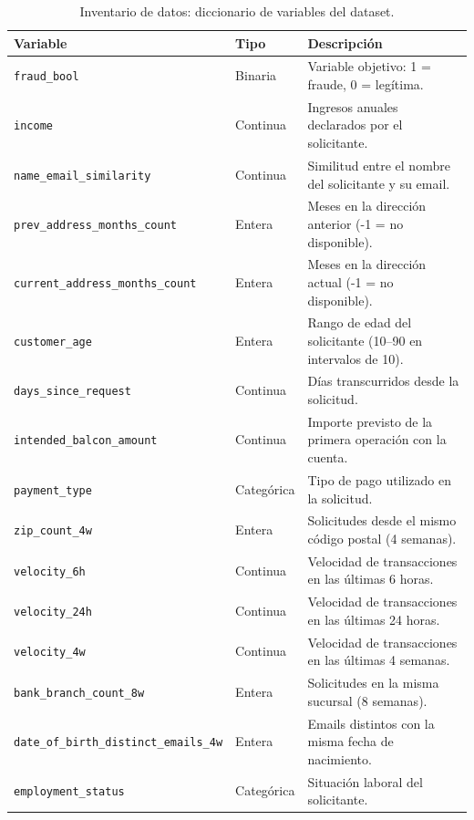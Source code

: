 \documentclass[12pt,a4paper]{report}
\begin{document}
\begin{table}[htbp]
\centering
\footnotesize
\caption{Inventario de datos: diccionario de variables del dataset.}
\label{tab:diccionario}
\begin{tabular}{l l p{7.5cm}}
\toprule
\textbf{Variable} & \textbf{Tipo} & \textbf{Descripción} \\
\midrule
\texttt{fraud\_bool}            & Binaria     & Variable objetivo: 1 = fraude, 0 = legítima. \\
\texttt{income}                 & Continua    & Ingresos anuales declarados por el solicitante. \\
\texttt{name\_email\_similarity} & Continua    & Similitud entre el nombre del solicitante y su email. \\
\texttt{prev\_address\_months\_count} & Entera & Meses en la dirección anterior (-1 = no disponible). \\
\texttt{current\_address\_months\_count} & Entera & Meses en la dirección actual (-1 = no disponible). \\
\texttt{customer\_age}          & Entera      & Rango de edad del solicitante (10--90 en intervalos de 10). \\
\texttt{days\_since\_request}   & Continua    & Días transcurridos desde la solicitud. \\
\texttt{intended\_balcon\_amount} & Continua  & Importe previsto de la primera operación con la cuenta. \\
\texttt{payment\_type}          & Categórica  & Tipo de pago utilizado en la solicitud. \\
\texttt{zip\_count\_4w}         & Entera      & Solicitudes desde el mismo código postal (4 semanas). \\
\texttt{velocity\_6h}           & Continua    & Velocidad de transacciones en las últimas 6 horas. \\
\texttt{velocity\_24h}          & Continua    & Velocidad de transacciones en las últimas 24 horas. \\
\texttt{velocity\_4w}           & Continua    & Velocidad de transacciones en las últimas 4 semanas. \\
\texttt{bank\_branch\_count\_8w} & Entera     & Solicitudes en la misma sucursal (8 semanas). \\
\texttt{date\_of\_birth\_distinct\_emails\_4w} & Entera & Emails distintos con la misma fecha de nacimiento. \\
\texttt{employment\_status}     & Categórica  & Situación laboral del solicitante. \\

\end{tabular}
\end{table}
\end{document}

